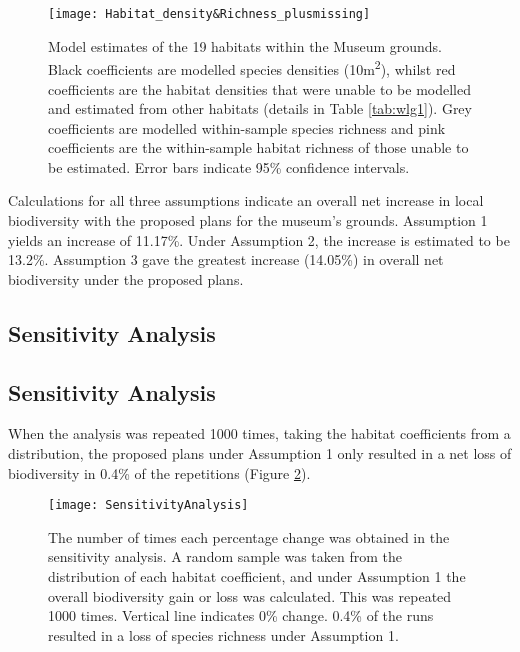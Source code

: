 \begin{figure}[t]
	\centering
	\texttt{[image: Habitat\_density\&Richness\_plusmissing]}
	\caption{Model estimates of the 19 habitats within the Museum grounds. Black coefficients are modelled species densities (10m\textsuperscript{2}), whilst red coefficients are the habitat densities that were unable to be modelled and estimated from other habitats (details in Table \ref{tab:wlg1}). Grey coefficients are modelled within-sample species richness and pink coefficients are the within-sample habitat richness of those unable to be estimated. Error bars indicate 95\% confidence intervals.}
   	 \label{fig:wlgmodel}
\end{figure}
	
Calculations for all three assumptions indicate an overall net increase in local biodiversity with the proposed plans for the museum's grounds. Assumption 1 yields an increase of 11.17\%. Under Assumption 2, the increase is estimated to be 13.2\%. Assumption 3 gave the greatest increase (14.05\%) in overall net biodiversity under the proposed plans.

\ifappendixStyle %
\subsection{Sensitivity Analysis}%
\else
\subsection*{Sensitivity Analysis}
\fi

When the analysis was repeated 1000 times, taking the habitat coefficients from a distribution, the proposed plans under Assumption 1 only resulted in a net loss of biodiversity in 0.4\% of the repetitions (Figure \ref{fig:wlgsensitivity}).

\begin{figure}[t]
	\centering
	\texttt{[image: SensitivityAnalysis]}
	\caption{The number of times each percentage change was obtained in the sensitivity analysis. A random sample was taken from the distribution of each habitat coefficient, and under Assumption 1 the overall biodiversity gain or loss was calculated. This was repeated 1000 times. Vertical line indicates 0\% change. 0.4\% of the runs resulted in a loss of species richness under Assumption 1.}
   	 \label{fig:wlgsensitivity}
\end{figure}

\ifappendixStyle %
